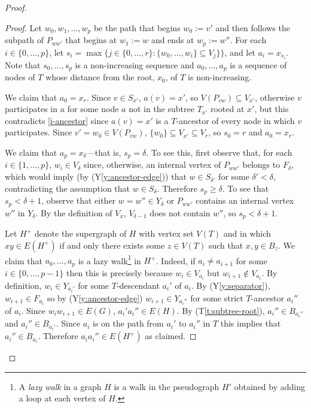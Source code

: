 \documentclass{patmorin}
\newcommand{\tref}[1]{(T\ref{t:#1})}
\newcommand{\yref}[1]{(Y\ref{y:#1})}
\renewcommand{\ge}{\geqslant}
\begin{document}
\begin{proof}
\begin{proof}
  Let $w_0,w_1,\ldots,w_p$ be the path that begins $w_0:=v'$ and then follows the subpath of $P_{ww'}$ that begins at $w_1:=w$ and ends at $w_p:=w''$.  For each $i\in\{0,\ldots,p\}$, let $s_i=\max\{j\in\{0,\ldots,r\}: \{w_0,\ldots,w_i\}\subseteq V_{j}\}\}$, and let $a_i=x_{s_i}$.  Note that $s_0,\ldots,s_p$ is a non-increasing sequence and $a_0,\ldots,a_p$ is a sequence of nodes of $T$ whose distance from the root, $x_0$, of $T$ is non-increasing.

  We claim that $a_0=x_r$.  Since $v\in S_{x'}$, $a(v)=x'$, so $V(P_{vw})\subseteq V_{x'}$, otherwise $v$ participates in $a$ for some node $a$ not in the subtree $T_{x'}$ rooted at $x'$, but this contradicts \cref{i-ancestor} since $a(v)=x'$ is a $T$-ancestor of every node in which $v$ participates.  Since $v'=w_0\in V(P_{vw})$, $\{w_0\}\subseteq V_{x'}\subseteq V_{r}$, so $s_0=r$ and $a_0=x_r$.

  We claim that $a_p=x_\delta$---that is, $s_p=\delta$.
  To see this, first observe that, for each $i\in\{1,\ldots,p\}$, $w_i\in V_{\delta}$ since, otherwise, an internal vertex of $P_{ww'}$ belongs to $F_\delta$, which would imply (by \yref{ancestor-edge}) that $w\in S_{\delta'}$ for some $\delta' < \delta$, contradicting the assumption that $w\in S_\delta$.  Therefore $s_p\ge\delta$.  To see that $s_p<\delta+1$,
  observe that either $w=w''\in Y_\delta$ or $P_{ww'}$ contains an internal vertex $w''$ in $Y_\delta$.  By the definition of $V_x$, $V_{\delta-1}$ does not contain $w''$, so $s_p<\delta+1$.

  Let $H^+$ denote the supergraph of $H$ with vertex set $V(T)$ and in which $xy\in E(H^+)$ if and only there exists some $z\in V(T)$ such that $x,y\in B_z$.
  We claim that $a_0,\ldots,a_p$ is a lazy walk\footnote{A \emph{lazy walk} in a graph $H$ is a walk in the pseudograph $H'$ obtained by adding a loop at each vertex of $H$.} in $H^+$.  Indeed, if $a_i\neq a_{i+1}$ for some $i\in\{0,\ldots,p-1\}$ then this is precisely because $w_i\in V_{a_i}$ but $w_{i+1}\not\in V_{a_i}$.  By definition, $w_i\in Y_{a_i'}$ for some $T$-descendant $a_i'$ of $a_i$.
  By \yref{separator}, $w_{i+1}\in F_{a_i}$ so by \yref{ancestor-edge} $w_{i+1}\in Y_{a_i''}$ for some strict $T$-ancestor $a_i''$ of $a_i$.  Since $w_iw_{i+1}\in E(G)$, $a_i'a_i''\in E(H)$.  By \tref{subtree-root}, $a_i''\in B_{a_i''}$ and $a_i''\in B_{a_i'}$.  Since $a_i$ is on the path from $a_i'$ to $a_i''$ in $T$ this implies that $a_i''\in B_{a_i}$.  Therefore $a_ia_i''\in E(H^+)$ as claimed.


\end{proof}
\end{proof}
\end{document}
